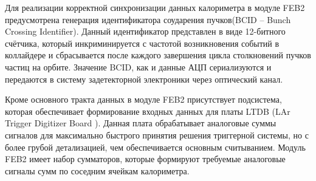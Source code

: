 Для реализации корректной синхронизации данных калориметра в модуле FEB2 предусмотрена генерация идентификатора соударения пучков(BCID -- Bunch Crossing Identifier). Данный идентификатор представлен в виде 12-битного счётчика, который инкриминируется с частотой возникновения событий в коллайдере и сбрасывается после каждого завершения цикла столкновений пучков частиц на орбите. Значение BCID, как и данные АЦП сериализуются и передаются в систему задетекторной электроники через оптический канал.\par
Кроме основного тракта данных в модуле FEB2 присутствует подсистема, которая обеспечивает формирование входных данных для платы LTDB (LAr Trigger Digitizer Board \parencite{ltdb}). Данная плата обрабатывает аналоговые суммы сигналов для максимально быстрого принятия решения триггерной системы, но с более грубой детализацией, чем обеспечивается основным считыванием. Модуль FEB2 имеет набор сумматоров, которые формируют требуемые аналоговые сигналы сумм по соседним ячейкам калориметра.\par
